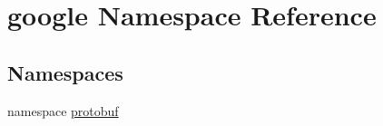 \hypertarget{namespacegoogle}{\section{google Namespace Reference}
\label{namespacegoogle}
}
\subsection*{Namespaces}
\begin{DoxyCompactItemize}
\item 
namespace \hyperlink{namespacegoogle_1_1protobuf}{protobuf}
\end{DoxyCompactItemize}
